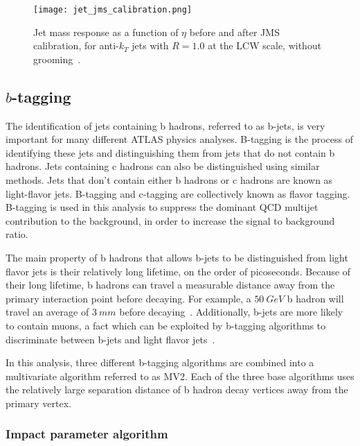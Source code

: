 \begin{figure}[!ht]
    \centering
\texttt{[image: jet\_jms\_calibration.png]}
\caption{Jet mass response as a function of $\eta$ before and after JMS calibration, for anti-$k_T$ jets
with $R=1.0$ at the LCW scale, without grooming~\cite{jet-substructure-perf}.}
\label{fig:jet_jms_response}
\end{figure}

\subsection{$b$-tagging}\label{subsec:jet_b_tagging}

The identification of jets containing b hadrons, referred to as b-jets, is very important for many different ATLAS physics analyses.
B-tagging is the process of identifying these jets and distinguishing them from jets that do not contain b hadrons.
Jets containing c hadrons can also be distinguished using similar methods.
Jets that don't contain either b hadrons or c hadrons are known as light-flavor jets.
B-tagging and c-tagging are collectively known as flavor tagging.
B-tagging is used in this analysis to suppress the dominant QCD multijet contribution to the background, in order to increase the signal to background ratio.

The main property of b hadrons that allows b-jets to be distinguished from light flavor jets is their relatively long lifetime, on the order of picoseconds.
Because of their long lifetime, b hadrons can travel a measurable distance away from the primary interaction point before decaying.
For example, a $50~GeV$ b hadron will travel an average of $3~mm$ before decaying~\cite{jet-bjet-perf}.
Additionally, b-jets are more likely to contain muons, a fact which can be exploited by b-tagging
algorithms to discriminate between b-jets and light flavor jets~\cite{jet-bjet-perf}.

In this analysis, three different b-tagging algorithms are combined into a multivariate algorithm referred to as MV2.
Each of the three base algorithms uses the relatively large separation distance of b hadron decay vertices away from the primary vertex.

\subsubsection{Impact parameter algorithm}\label{subsubsec:jet_btag_ip}

